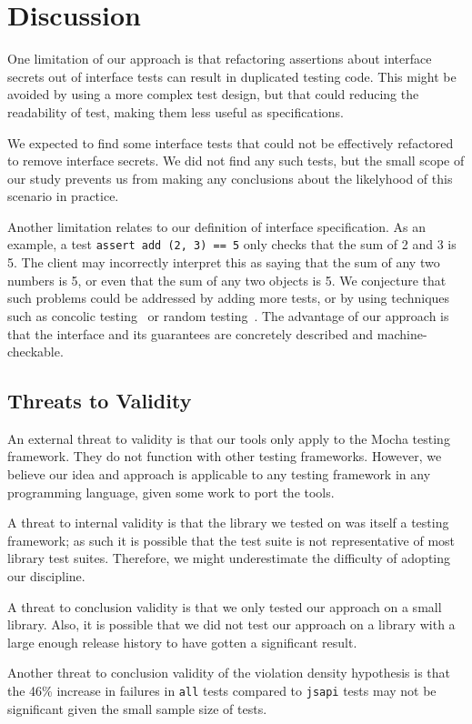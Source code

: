 \section{Discussion}
One limitation of our approach is that refactoring assertions about
interface secrets out of interface tests can result in duplicated testing
code. This might be avoided by using a more complex test design, but
that could reducing the readability of test, making them less useful
as specifications.

We expected to find some interface tests that could not be effectively
refactored to remove interface secrets. We did not find any such tests, but
the small scope of our study prevents us from making any conclusions
about the likelyhood of this scenario in practice. 

Another limitation relates to our definition of interface
specification. As an example, a test \texttt{assert add (2, 3) == 5}
only checks that the sum of 2 and 3 is 5. The client may incorrectly
interpret this as saying that the sum of any two numbers is 5, or
even that the sum of any two objects is 5. We conjecture that such
problems could be addressed by adding more tests, or by using
techniques such as concolic testing~\cite{sen05-cute} or random
testing~\cite{quickcheck}. The advantage of our approach is that the
interface and its guarantees are concretely described and
machine-checkable.

\subsection{Threats to Validity}
An external threat to validity is that our tools only apply to the
Mocha testing framework. They do not function with other testing
frameworks. However, we believe our idea and approach is applicable
to any testing framework in any programming language, given some work
to port the tools.

A threat to internal validity is that the library we tested on was
itself a testing framework; as such it is possible that the test
suite is not representative of most library test suites. Therefore,
we might underestimate the difficulty of adopting our discipline.

A threat to conclusion validity is that we only tested our approach
on a small library. Also, it is possible that we did not test our
approach on a library with a large enough release history to have
gotten a significant result.

Another threat to conclusion validity of the violation density
hypothesis is that the 46\% increase in failures in {\tt all} tests
compared to {\tt jsapi} tests may not be significant given the small
sample size of tests.

